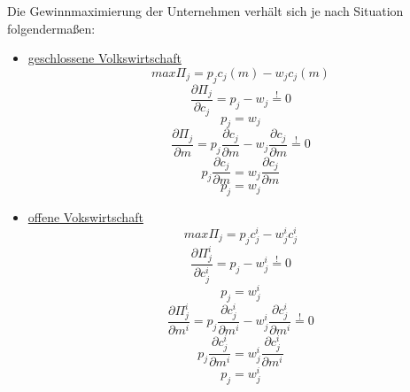 Die Gewinnmaximierung der Unternehmen verhält sich je nach Situation folgendermaßen: 
\begin{itemize}
\item \underline{geschlossene Volkswirtschaft}
\begin{equation} max\Pi_j=p_jc_j(m)-w_jc_j(m)\end{equation}
\begin{equation}\frac{\partial \Pi_j}{\partial c_j}=p_j-w_j\overset{!}{=}0\end{equation}
\begin{equation}p_j=w_j\end{equation}
\begin{equation}\frac{\partial \Pi_j}{\partial m}=p_j\frac{\partial c_j}{\partial m}-w_j\frac{\partial c_j}{\partial m}\overset{!}{=}0\end{equation}
\begin{equation}p_j\frac{\partial c_j}{\partial m}=w_j\frac{\partial c_j}{\partial m}\end{equation}
\begin{equation}p_j=w_j\end{equation}
\begin{center}
\begin{flushright}
\newline
\end{flushright}
\end{center}

\item \underline{offene Vokswirtschaft}
\begin{equation} max\Pi_j=p_jc^i_j-w^i_jc^i_j\end{equation}
\begin{equation}\frac{\partial \Pi^i_j}{\partial c^i_j}=p_j-w^i_j\overset{!}{=}0\end{equation} 
\begin{equation}p_j=w^i_j\end{equation}
\begin{equation}\frac{\partial \Pi^i_j}{\partial m^i}=p_j\frac{\partial c^i_j}{\partial m^i}-w^i_j\frac{\partial c^i_j}{\partial m^i}\overset{!}{=}0\end{equation}
\begin{displaymath}p_j\frac{\partial c^i_j}{\partial m^i}=w^i_j\frac{\partial c^i_j}{\partial m^i}\end{displaymath}
\begin{equation}p_j=w^i_j\end{equation}
\begin{flushright}
\begin{center}
\end{center}
\end{flushright}


\end{itemize}
